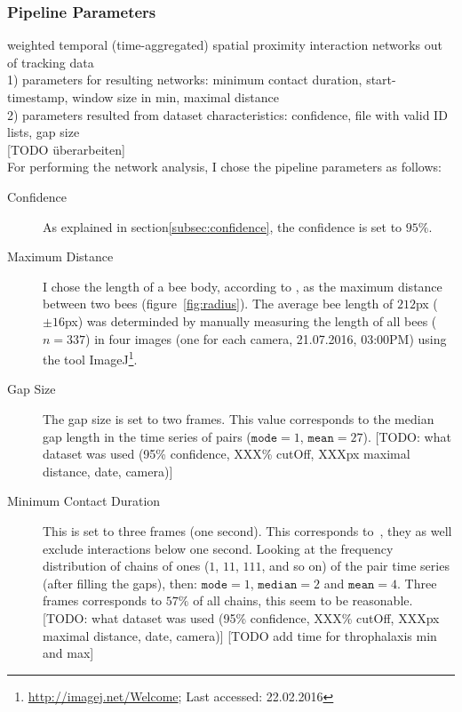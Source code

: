 \subsubsection{Pipeline Parameters}
weighted temporal (time-aggregated) spatial proximity interaction networks out of tracking data\\
1) parameters for resulting networks: minimum contact duration, start-timestamp, window size in min, maximal distance\\
2) parameters resulted from dataset characteristics: confidence, file with valid ID lists, gap size\\

[TODO überarbeiten]\\

For performing the network analysis, I chose the pipeline parameters as follows:

\begin{description}
\item[Confidence] As explained in section\ref{subsec:confidence}, the confidence is set to $95\%$.

\item[Maximum Distance] I chose the length of a bee body, according to \textcite{baracchi2014socio}, as the maximum distance between two bees (figure~\ref{fig:radius}). The average bee length of $212$px ($\pm 16$px)  was determinded by manually measuring the length of all bees ($n=337$) in four images (one for each camera, 21.07.2016, 03:00PM) using the tool ImageJ\footnote{\url{http://imagej.net/Welcome}; Last accessed: 22.02.2016}.

\item[Gap Size] The gap size is set to two frames. This value corresponds to the median gap length in the time series of pairs ($\texttt{mode}=1$, $\texttt{mean}=27$). [TODO: what dataset was used (95\% confidence, XXX\% cutOff, XXXpx maximal distance, date, camera)]

\item[Minimum Contact Duration] This is set to three frames (one second). This corresponds to~\textcite{mersch2013tracking}, they as well exclude interactions below one second. Looking at the frequency distribution of chains of ones ($1$, $11$, $111$, and so on) of the pair time series (after filling the gaps), then: $\texttt{mode}=1$, $\texttt{median}=2$ and $\texttt{mean}=4$. Three frames corresponds to $57\%$ of all chains, this seem to be reasonable. [TODO: what dataset was used (95\% confidence, XXX\% cutOff, XXXpx maximal distance, date, camera)] [TODO add time for throphalaxis min and max]

\end{description}

